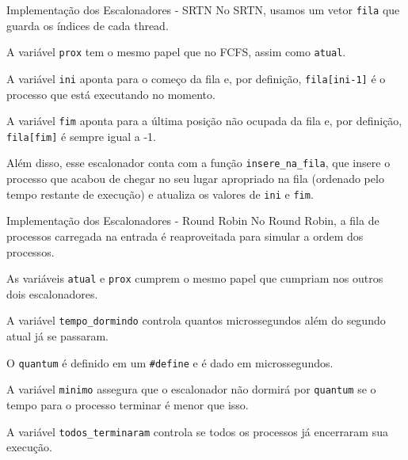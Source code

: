 \documentclass[10pt]{beamer}
\begin{document}
    \begin{frame}{Implementação dos Escalonadores - SRTN}
        No SRTN, usamos um vetor \texttt{fila} que guarda os índices de cada thread.

        A variável \texttt{prox} tem o mesmo papel que no FCFS, assim como
        \texttt{atual}.

        A variável \texttt{ini} aponta para o começo da fila e, por definição,
        \texttt{fila[ini-1]} é o processo que está executando no momento.

        A variável \texttt{fim} aponta para a última posição não ocupada da fila e,
        por definição, \texttt{fila[fim]} é sempre igual a -1.

        Além disso, esse escalonador conta com a função \texttt{insere\_na\_fila}, que
        insere o processo que acabou de chegar no seu lugar apropriado na fila
        (ordenado pelo tempo restante de execução) e atualiza os valores de
        \texttt{ini} e \texttt{fim}.
    \end{frame}

    \begin{frame}{Implementação dos Escalonadores - Round Robin}
        No Round Robin, a fila de processos carregada na entrada é reaproveitada para simular a ordem dos processos.

        As variáveis \texttt{atual} e \texttt{prox} cumprem o mesmo papel que cumpriam nos outros dois escalonadores.

        A variável \texttt{tempo\_dormindo} controla quantos microssegundos além do segundo atual já se passaram.

        O \texttt{quantum} é definido em um \texttt{\#define} e é dado em microssegundos.

        A variável \texttt{minimo} assegura que o escalonador não dormirá por \texttt{quantum} se o tempo para o processo terminar é menor que isso.

        A variável \texttt{todos\_terminaram} controla se todos os processos já encerraram sua execução.
    \end{frame}
\end{document}
